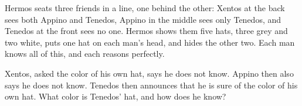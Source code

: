 Hermos seats three friends in a line, one behind the other: Xentos at the back sees both Appino and Tenedos, Appino in the middle sees only Tenedos, and Tenedos at the front sees no one. Hermos shows them five hats, three grey and two white, puts one hat on each man's head, and hides the other two. Each man knows all of this, and each reasons perfectly.

Xentos, asked the color of his own hat, says he does not know. Appino then also says he does not know. Tenedos then announces that he is sure of the color of his own hat. What color is Tenedos' hat, and how does he know?

